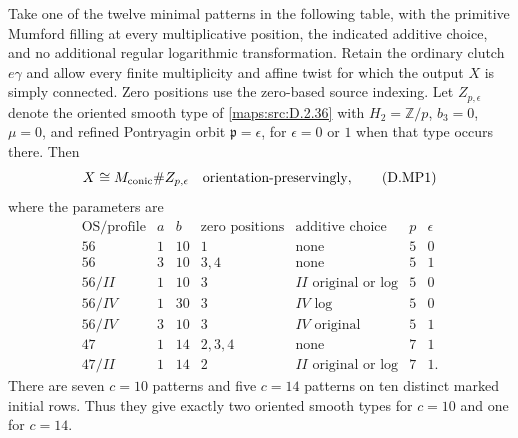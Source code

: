 \begin{theorem}
Take one of the twelve minimal patterns in the following table,
with the primitive Mumford filling at every multiplicative position,
the indicated additive choice, and no additional regular logarithmic
transformation. Retain the ordinary clutch $e\gamma$ and allow every
finite multiplicity and affine twist for which the output $X$ is
simply connected. Zero positions use the zero-based source indexing.
Let $Z_{p,\epsilon}$ denote the oriented smooth type of \ref{maps:src:D.2.36} with
$H_2=\mathbb Z/p$, $b_3=0$, $\mu=0$, and refined Pontryagin
orbit $\mathfrak p=\epsilon$, for $\epsilon=0$ or $1$ when that
type occurs there. Then
\[
                  X\cong M_{\mathrm{conic}}\# Z_{p,\epsilon}
                     \quad\hbox{orientation-preservingly},
                                                        \tag{D.MP1}\label{maps:eq:D.MP1}
\]
where the parameters are
\[
\begin{array}{c|r|r|l|l|r|r}
\text{OS/profile}&a&b&\text{zero positions}&\text{additive choice}&p&\epsilon\\\hline
56&1&10&1&\text{none}&5&0\\
56&3&10&3,4&\text{none}&5&1\\
56/II&1&10&3&II\text{ original or log}&5&0\\
56/IV&1&30&3&IV\text{ log}&5&0\\
56/IV&3&10&3&IV\text{ original}&5&1\\
47&1&14&2,3,4&\text{none}&7&1\\
47/II&1&14&2&II\text{ original or log}&7&1.
\end{array}                                               \tag{D.MP2}\label{maps:eq:D.MP2}
\]
There are seven $c=10$ patterns and five $c=14$ patterns on ten
distinct marked initial rows. Thus they give exactly two oriented
smooth types for $c=10$ and one for $c=14$.

\end{theorem}


